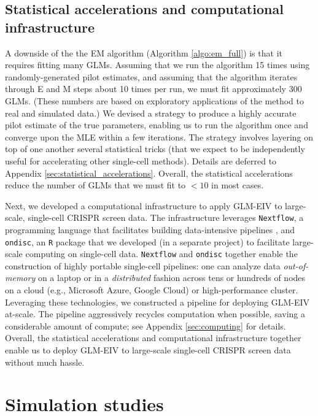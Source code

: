 \documentclass[12pt]{article}
\begin{document}
\subsection{Statistical accelerations and computational infrastructure}
A downside of the the EM algorithm (Algorithm \ref{algo:em_full}) is that it requires fitting many GLMs. Assuming that we run the algorithm 15 times using randomly-generated pilot estimates, and assuming that the algorithm iterates through E and M steps about 10 times per run, we must fit approximately 300 GLMs. (These numbers are based on exploratory applications of the method to real and simulated data.) We devised a strategy to produce a highly accurate pilot estimate of the true parameters, enabling us to run the algorithm once and converge upon the MLE within a few iterations. The strategy involves layering on top of one another several statistical tricks (that we expect to be independently useful for accelerating other single-cell methods). Details are deferred to Appendix \ref{sec:statistical_accelerations}. Overall, the statistical accelerations reduce the number of GLMs that we must fit to $<10$ in most cases.

Next, we developed a computational infrastructure to apply GLM-EIV to large-scale, single-cell CRISPR screen data. The infrastructure leverages \texttt{Nextflow}, a programming language that facilitates building data-intensive pipelines \parencite{DITommaso2017}, and \texttt{ondisc}, an \texttt{R} package that we developed (in a separate project) to facilitate large-scale computing on single-cell data. \texttt{Nextflow} and \texttt{ondisc} together enable the construction of highly portable single-cell pipelines: one can analyze data \textit{out-of-memory} on a laptop or in a \textit{distributed} fashion across tens or hundreds of nodes on a cloud (e.g., Microsoft Azure, Google Cloud) or high-performance cluster. Leveraging these technologies, we constructed a pipeline for deploying GLM-EIV at-scale. The pipeline aggressively recycles computation when possible, saving a considerable amount of compute; see Appendix \ref{sec:computing} for details. Overall, the statistical accelerations and computational infrastructure together enable us to deploy GLM-EIV to large-scale single-cell CRISPR screen data without much hassle.

\section{Simulation studies}\label{sec:simulation}
\end{document}
